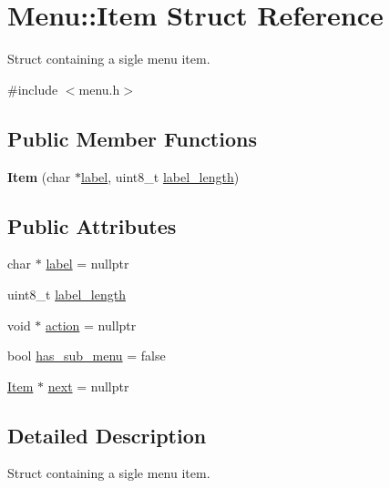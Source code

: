 \hypertarget{struct_menu_1_1_item}{\section{Menu\-:\-:Item Struct Reference}
\label{struct_menu_1_1_item}
}


Struct containing a sigle menu item.  




{\ttfamily \#include $<$menu.\-h$>$}

\subsection*{Public Member Functions}
\begin{DoxyCompactItemize}
\item 
\hypertarget{struct_menu_1_1_item_ad87fb2f4d51e4c095b93af5ea4bd2275}{{\bfseries Item} (char $\ast$\hyperlink{struct_menu_1_1_item_a378723382fc64c752a85ffe6fec9707e}{label}, uint8\-\_\-t \hyperlink{struct_menu_1_1_item_a46749d046bbbde8d5308848d5394c2dc}{label\-\_\-length})}\label{struct_menu_1_1_item_ad87fb2f4d51e4c095b93af5ea4bd2275}

\end{DoxyCompactItemize}
\subsection*{Public Attributes}
\begin{DoxyCompactItemize}
\item 
char $\ast$ \hyperlink{struct_menu_1_1_item_a378723382fc64c752a85ffe6fec9707e}{label} = nullptr
\item 
uint8\-\_\-t \hyperlink{struct_menu_1_1_item_a46749d046bbbde8d5308848d5394c2dc}{label\-\_\-length}
\item 
void $\ast$ \hyperlink{struct_menu_1_1_item_a247e140fed2addf80986ba5a3506b9dd}{action} = nullptr
\item 
bool \hyperlink{struct_menu_1_1_item_a5c9895a137458b9a12dafd447ac7430b}{has\-\_\-sub\-\_\-menu} = false
\item 
\hyperlink{struct_menu_1_1_item}{Item} $\ast$ \hyperlink{struct_menu_1_1_item_aadcc1e4e824296c6b72ac7d053f06869}{next} = nullptr
\end{DoxyCompactItemize}


\subsection{Detailed Description}
Struct containing a sigle menu item. 

